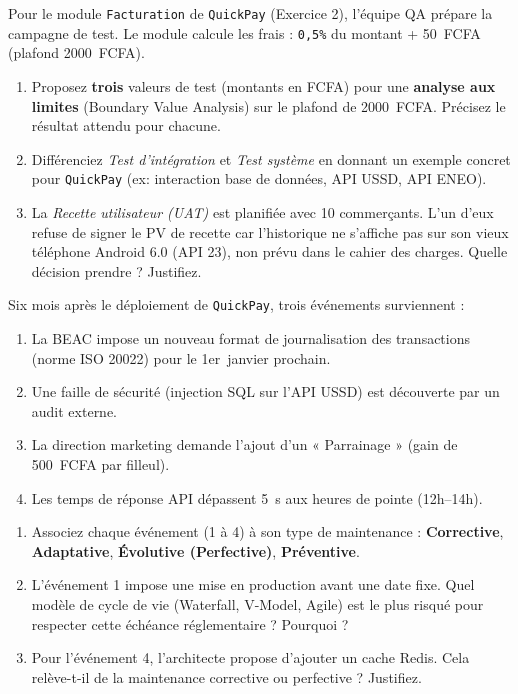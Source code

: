 \documentclass[11pt]{article}
\begin{document}
\begin{exercice}
Pour le module \texttt{Facturation} de \texttt{QuickPay} (Exercice 2), l'équipe QA prépare la campagne de test. Le module calcule les frais : \texttt{0,5\%} du montant + \SI{50}{FCFA} (plafond \SI{2000}{FCFA}).
\begin{enumerate}
    \item Proposez \textbf{trois} valeurs de test (montants en FCFA) pour une \textbf{analyse aux limites} (Boundary Value Analysis) sur le plafond de \SI{2000}{FCFA}. Précisez le résultat attendu pour chacune.
    \item Différenciez \textit{Test d'intégration} et \textit{Test système} en donnant un exemple concret pour \texttt{QuickPay} (ex: interaction base de données, API USSD, API ENEO).
    \item La \textit{Recette utilisateur (UAT)} est planifiée avec 10 commerçants. L'un d'eux refuse de signer le PV de recette car l'historique ne s'affiche pas sur son vieux téléphone Android 6.0 (API 23), non prévu dans le cahier des charges. Quelle décision prendre ? Justifiez.
\end{enumerate}
\end{exercice}

\begin{exercice}
Six mois après le déploiement de \texttt{QuickPay}, trois événements surviennent :
\begin{enumerate}
    \item La BEAC impose un nouveau format de journalisation des transactions (norme ISO 20022) pour le \SI{1er}{janvier} prochain.
    \item Une faille de sécurité (injection SQL sur l'API USSD) est découverte par un audit externe.
    \item La direction marketing demande l'ajout d'un « Parrainage » (gain de \SI{500}{FCFA} par filleul).
    \item Les temps de réponse API dépassent \SI{5}{\second} aux heures de pointe (12h--14h).
\end{enumerate}
\begin{enumerate}
    \item Associez chaque événement (1 à 4) à son type de maintenance : \textbf{Corrective}, \textbf{Adaptative}, \textbf{Évolutive (Perfective)}, \textbf{Préventive}.
    \item L'événement 1 impose une mise en production avant une date fixe. Quel modèle de cycle de vie (Waterfall, V-Model, Agile) est le plus risqué pour respecter cette échéance réglementaire ? Pourquoi ?
    \item Pour l'événement 4, l'architecte propose d'ajouter un cache Redis. Cela relève-t-il de la maintenance corrective ou perfective ? Justifiez.
\end{enumerate}
\end{exercice}
\end{document}
